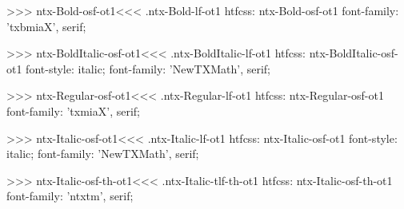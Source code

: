 >>>
\<ntx-Bold-osf-ot1\><<<
.ntx-Bold-lf-ot1
htfcss:  ntx-Bold-osf-ot1  font-family: 'txbmiaX', serif;

>>>
\<ntx-BoldItalic-osf-ot1\><<<
.ntx-BoldItalic-lf-ot1
htfcss:  ntx-BoldItalic-osf-ot1  font-style: italic; font-family: 'NewTXMath', serif;

>>>
\<ntx-Regular-osf-ot1\><<<
.ntx-Regular-lf-ot1
htfcss:  ntx-Regular-osf-ot1  font-family: 'txmiaX', serif;

>>>
\<ntx-Italic-osf-ot1\><<<
.ntx-Italic-lf-ot1
htfcss:  ntx-Italic-osf-ot1  font-style: italic; font-family: 'NewTXMath', serif;

>>>
\<ntx-Italic-osf-th-ot1\><<<
.ntx-Italic-tlf-th-ot1
htfcss:  ntx-Italic-osf-th-ot1  font-family: 'ntxtm', serif;

